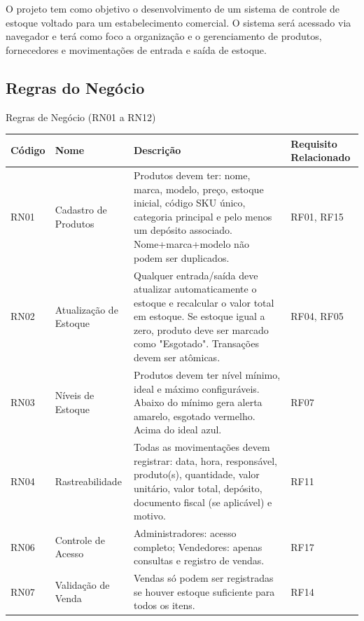 \documentclass[
	12pt,				%
	openright,			%
	twoside,			%
	a4paper,			%
	english,			%
	french,				%
	spanish,			%
	brazil				%
	]{abntex2}
\begin{document}
O projeto tem como objetivo o desenvolvimento de um sistema de controle de estoque voltado para um estabelecimento comercial. O sistema será acessado via navegador e terá como foco a organização e o gerenciamento de produtos, fornecedores e movimentações de entrada e saída de estoque.




\subsection{Regras do Negócio}



\begin{quadro}[htb]
\caption{\label{quadro_rn}Regras de Negócio (RN01 a RN12)}
\begin{tabular}{|p{1.2cm}|p{4.0cm}|p{7.5cm}|p{2.0cm}|}
    \hline
    \textbf{Código} & \textbf{Nome} & \textbf{Descrição} & \textbf{Requisito Relacionado} \\ \hline

    RN01 & Cadastro de Produtos & Produtos devem ter: nome, marca, modelo, preço, estoque inicial, código SKU único, categoria principal e pelo menos um depósito associado. Nome+marca+modelo não podem ser duplicados. & RF01, RF15 \\ \hline

    RN02 & Atualização de Estoque & Qualquer entrada/saída deve atualizar automaticamente o estoque e recalcular o valor total em estoque. Se estoque igual a zero, produto deve ser marcado como "Esgotado". Transações devem ser atômicas. & RF04, RF05 \\ \hline

    RN03 & Níveis de Estoque & Produtos devem ter nível mínimo, ideal e máximo configuráveis. Abaixo do mínimo gera alerta amarelo, esgotado vermelho. Acima do ideal azul. & RF07 \\ \hline

    RN04 & Rastreabilidade & Todas as movimentações devem registrar: data, hora, responsável, produto(s), quantidade, valor unitário, valor total, depósito, documento fiscal (se aplicável) e motivo. & RF11 \\ \hline

    RN06 & Controle de Acesso & Administradores: acesso completo; Vendedores: apenas consultas e registro de vendas. & RF17 \\ \hline

    RN07 & Validação de Venda & Vendas só podem ser registradas se houver estoque suficiente para todos os itens. & RF14 \\ \hline


\end{tabular}
\end{quadro}
\end{document}
